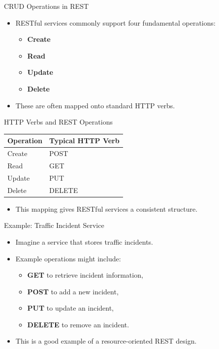 \begin{frame}{CRUD Operations in REST}
\begin{itemize}
    \item RESTful services commonly support four fundamental operations:
    \begin{itemize}
        \item \textbf{Create}
        \item \textbf{Read}
        \item \textbf{Update}
        \item \textbf{Delete}
    \end{itemize}
    \item These are often mapped onto standard HTTP verbs.
\end{itemize}
\end{frame}

\begin{frame}{HTTP Verbs and REST Operations}
\begin{table}
\centering
\begin{tabular}{ll}
\toprule
Operation & Typical HTTP Verb \\
\midrule
Create & POST \\
Read & GET \\
Update & PUT \\
Delete & DELETE \\
\bottomrule
\end{tabular}
\end{table}

\vspace{0.5em}
\begin{itemize}
    \item This mapping gives RESTful services a consistent structure.
\end{itemize}
\end{frame}

\begin{frame}{Example: Traffic Incident Service}
\begin{itemize}
    \item Imagine a service that stores traffic incidents.
    \item Example operations might include:
    \begin{itemize}
        \item \textbf{GET} to retrieve incident information,
        \item \textbf{POST} to add a new incident,
        \item \textbf{PUT} to update an incident,
        \item \textbf{DELETE} to remove an incident.
    \end{itemize}
    \item This is a good example of a resource-oriented REST design.
\end{itemize}
\end{frame}

